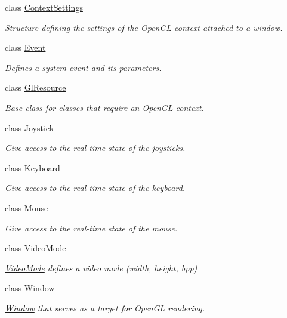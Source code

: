 \begin{DoxyCompactItemize}
class \hyperlink{structsf_1_1_context_settings}{Context\-Settings}
\begin{DoxyCompactList}\small\item\em Structure defining the settings of the Open\-G\-L context attached to a window. \end{DoxyCompactList}\item 
class \hyperlink{classsf_1_1_event}{Event}
\begin{DoxyCompactList}\small\item\em Defines a system event and its parameters. \end{DoxyCompactList}\item 
class \hyperlink{classsf_1_1_gl_resource}{Gl\-Resource}
\begin{DoxyCompactList}\small\item\em Base class for classes that require an Open\-G\-L context. \end{DoxyCompactList}\item 
class \hyperlink{classsf_1_1_joystick}{Joystick}
\begin{DoxyCompactList}\small\item\em Give access to the real-\/time state of the joysticks. \end{DoxyCompactList}\item 
class \hyperlink{classsf_1_1_keyboard}{Keyboard}
\begin{DoxyCompactList}\small\item\em Give access to the real-\/time state of the keyboard. \end{DoxyCompactList}\item 
class \hyperlink{classsf_1_1_mouse}{Mouse}
\begin{DoxyCompactList}\small\item\em Give access to the real-\/time state of the mouse. \end{DoxyCompactList}\item 
class \hyperlink{classsf_1_1_video_mode}{Video\-Mode}
\begin{DoxyCompactList}\small\item\em \hyperlink{classsf_1_1_video_mode}{Video\-Mode} defines a video mode (width, height, bpp) \end{DoxyCompactList}\item 
class \hyperlink{classsf_1_1_window}{Window}
\begin{DoxyCompactList}\small\item\em \hyperlink{classsf_1_1_window}{Window} that serves as a target for Open\-G\-L rendering. \end{DoxyCompactList}\end{DoxyCompactItemize}
